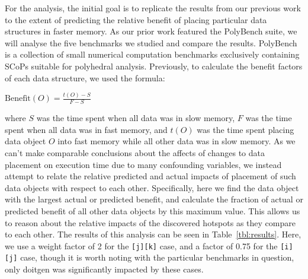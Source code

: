 For the analysis, the initial goal is to replicate the results from our previous work to the extent of predicting the relative benefit of placing particular data structures in faster memory.
As our prior work featured the PolyBench suite, we will analyse the five benchmarks we studied and compare the results.
PolyBench is a collection of small numerical computation benchmarks exclusively containing \acp{SCoP} suitable for polyhedral analysis.
Previously, to calculate the benefit factors of each data structure, we used the formula:
\begin{center}
$\text{Benefit}(O) = \frac{t(O) - S}{F - S}$
\end{center}
where $S$ was the time spent when all data was in slow memory, $F$ was the time spent when all data was in fast memory, and $t(O)$ was the time spent placing data object $O$ into fast memory while all other data was in slow memory.
As we can't make comparable conclusions about the affects of changes to data placement on execution time due to many confounding variables, we instead attempt to relate the relative predicted and actual impacts of placement of such data objects with respect to each other.
Specifically, here we find the data object with the largest actual or predicted benefit, and calculate the fraction of actual or predicted benefit of all other data objects by this maximum value.
This allows us to reason about the relative impacts of the discovered hotspots as they compare to each other.
The results of this analysis can be seen in Table~\ref{tbl:results}.
Here, we use a weight factor of 2 for the \texttt{[j][k]} case, and a factor of 0.75 for the \texttt{[i][j]} case, though it is worth noting with the particular benchmarks in question, only doitgen was significantly impacted by these cases.

